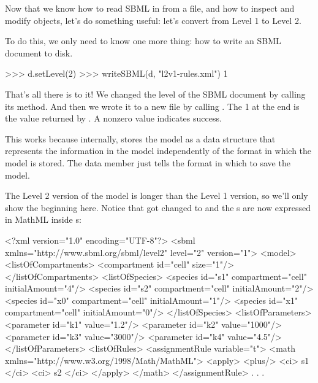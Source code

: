 \documentclass{sbmlmanual}
\begin{document}
Now that we know how to read SBML in from a file, and how to
inspect and modify \libsbml{} objects, let's do something
useful: let's convert  from Level 1 to Level 2.

To do this, we only need to know one more thing: how to write
an SBML document to disk.  

\begin{shellVerbatim}
>>> d.setLevel(2)
>>> writeSBML(d, "l2v1-rules.xml")
1
\end{shellVerbatim}

That's all there is to it!  We changed the level of the SBML
document by calling its  method.  And then we wrote
it to a new file by calling .  The 1 at the end is
the value returned by .  A nonzero value indicates
success.

This works because internally, \libsbml{} stores the model as a data structure
that represents the information in the model independently of the format in
which the model is stored.  The  data member just tells
 the format in which to save the model.

The Level 2 version of the model is longer than the Level 1 version, so we'll
only show the beginning here.  Notice that  got changed to
 and the s are now expressed in MathML
inside s:

\begin{shellVerbatim}
<?xml version="1.0" encoding="UTF-8"?>
<sbml xmlns="http://www.sbml.org/sbml/level2" level="2" version="1">
  <model>
    <listOfCompartments>
      <compartment id="cell" size="1"/>
    </listOfCompartments>
    <listOfSpecies>
      <species id="s1" compartment="cell" initialAmount="4"/>
      <species id="s2" compartment="cell" initialAmount="2"/>
      <species id="x0" compartment="cell" initialAmount="1"/>
      <species id="x1" compartment="cell" initialAmount="0"/>
    </listOfSpecies>
    <listOfParameters>
      <parameter id="k1" value="1.2"/>
      <parameter id="k2" value="1000"/>
      <parameter id="k3" value="3000"/>
      <parameter id="k4" value="4.5"/>
    </listOfParameters>
    <listOfRules>
      <assignmentRule variable="t">
        <math xmlns="http://www.w3.org/1998/Math/MathML">
          <apply>
            <plus/>
            <ci> s1 </ci>
            <ci> s2 </ci>
          </apply>
        </math>
      </assignmentRule>
      . . .
\end{shellVerbatim}
\end{document}
